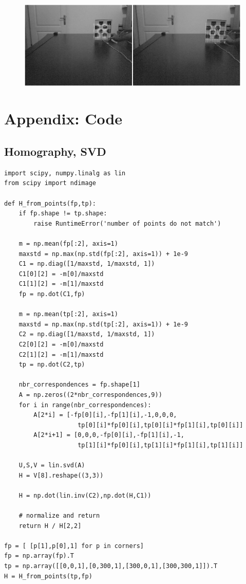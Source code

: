 \documentclass{article}
\begin{document}
\begin{figure}[h]
  \centering
  \includegraphics[width=30em]{kf4.jpg}
\end{figure}


\section{Appendix: Code}

\subsection{Homography, SVD}

\begin{verbatim}
import scipy, numpy.linalg as lin
from scipy import ndimage

def H_from_points(fp,tp):
    if fp.shape != tp.shape:
        raise RuntimeError('number of points do not match')
        
    m = np.mean(fp[:2], axis=1)
    maxstd = np.max(np.std(fp[:2], axis=1)) + 1e-9
    C1 = np.diag([1/maxstd, 1/maxstd, 1]) 
    C1[0][2] = -m[0]/maxstd
    C1[1][2] = -m[1]/maxstd
    fp = np.dot(C1,fp)
    
    m = np.mean(tp[:2], axis=1)
    maxstd = np.max(np.std(tp[:2], axis=1)) + 1e-9
    C2 = np.diag([1/maxstd, 1/maxstd, 1])
    C2[0][2] = -m[0]/maxstd
    C2[1][2] = -m[1]/maxstd
    tp = np.dot(C2,tp)
    
    nbr_correspondences = fp.shape[1]
    A = np.zeros((2*nbr_correspondences,9))
    for i in range(nbr_correspondences):        
        A[2*i] = [-fp[0][i],-fp[1][i],-1,0,0,0,
                    tp[0][i]*fp[0][i],tp[0][i]*fp[1][i],tp[0][i]]
        A[2*i+1] = [0,0,0,-fp[0][i],-fp[1][i],-1,
                    tp[1][i]*fp[0][i],tp[1][i]*fp[1][i],tp[1][i]]
    
    U,S,V = lin.svd(A)
    H = V[8].reshape((3,3))    
    
    H = np.dot(lin.inv(C2),np.dot(H,C1))
    
    # normalize and return
    return H / H[2,2]

fp = [ [p[1],p[0],1] for p in corners]
fp = np.array(fp).T
tp = np.array([[0,0,1],[0,300,1],[300,0,1],[300,300,1]]).T
H = H_from_points(tp,fp)
\end{verbatim}
\end{document}
